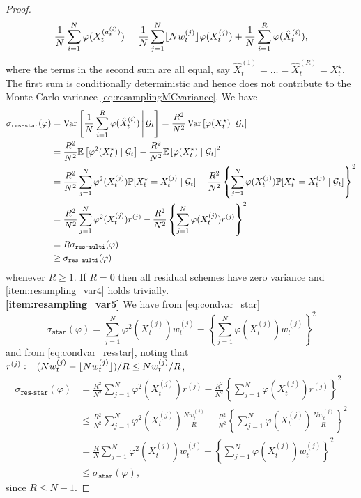 \begin{proof}
\begin{equation*}
\frac{1}{N} \sum_{i=1}^N \varphi( X_t^{(a_t^{(i)})} )
= \frac{1}{N} \sum_{j=1}^N \flnw[j] \varphi (X_t^{(j)})
        + \frac{1}{N} \sum_{i=1}^R \varphi (\hat{X}_t^{(i)}) ,
\end{equation*}
where the terms in the second sum are all equal, say $\hat{X}_t^{(1)} = \dots = \hat{X}_t^{(R)} = X_t^\star$.
The first sum is conditionally deterministic and hence does not contribute to the Monte Carlo variance \eqref{eq:resamplingMCvariance}.
We have
\begin{align}
\sigma_{\texttt{res-star}}(\varphi)
&= \V\left[ \frac{1}{N} \sum_{i=1}^R \varphi (\hat{X}_t^{(i)}) \midd \mathcal{G}_t \right] 
= \frac{R^2}{N^2} \V\left[ \varphi (X_t^\star) \midd \mathcal{G}_t \right] \notag\\
&= \frac{R^2}{N^2} \E\left[ \varphi^2( X_t^\star) \mid \mathcal{G}_t \right]
        - \frac{R^2}{N^2} \E\left[ \varphi( X_t^\star) \mid \mathcal{G}_t \right]^2 \notag\\
&= \frac{R^2}{N^2} \sum_{j=1}^N \varphi^2(X_t^{(j)}) 
        \Prob[ X_t^\star = X_t^{(j)} \mid \mathcal{G}_t ]
        - \frac{R^2}{N^2} \left\{ \sum_{j=1}^N \varphi(X_t^{(j)}) 
        \Prob[ X_t^\star = X_t^{(j)} \mid \mathcal{G}_t ] \right\}^2 \notag\\
&= \frac{R^2}{N^2} \sum_{j=1}^N \varphi^2(X_t^{(j)}) r^{(j)}
        - \frac{R^2}{N^2} \left\{ \sum_{j=1}^N \varphi(X_t^{(j)}) r^{(j)} \right\}^2 \label{eq:condvar_resstar}\\
&= R \sigma_{\texttt{res-multi}}(\varphi) \notag\\
&\geq \sigma_{\texttt{res-multi}}(\varphi) \notag
\end{align}
whenever $R\geq 1$. 
If $R=0$ then all residual schemes have zero variance and \ref{item:resampling_var4} holds trivially.\\
\textbf{\ref{item:resampling_var5}}
We have from \eqref{eq:condvar_star}
\begin{equation*}
\sigma_{\texttt{star}}(\varphi)
= \sum_{j=1}^N \varphi^2(X_t^{(j)}) w_t^{(j)}
        - \left\{ \sum_{j=1}^N \varphi(X_t^{(j)}) w_t^{(j)} \right\}^2
\end{equation*}
and from \eqref{eq:condvar_resstar}, noting that $r^{(j)} := (Nw_t^{(j)} - \flnw[j])/R \leq Nw_t^{(j)}/R$,
\begin{align*}
\sigma_{\texttt{res-star}}(\varphi)
&= \frac{R^2}{N^2} \sum_{j=1}^N \varphi^2(X_t^{(j)}) r^{(j)}
        - \frac{R^2}{N^2} \left\{ \sum_{j=1}^N \varphi(X_t^{(j)}) r^{(j)} \right\}^2 \\
&\leq \frac{R^2}{N^2} \sum_{j=1}^N \varphi^2(X_t^{(j)}) \frac{ N w_t^{(j)} }{R}
        - \frac{R^2}{N^2} \left\{ \sum_{j=1}^N \varphi(X_t^{(j)}) \frac{ N w_t^{(j)} }{R} \right\}^2 \\
&= \frac{R}{N} \sum_{j=1}^N \varphi^2(X_t^{(j)}) w_t^{(j)}
        - \left\{ \sum_{j=1}^N \varphi(X_t^{(j)}) w_t^{(j)} \right\}^2 \\
&\leq \sigma_{\texttt{star}}(\varphi) ,
\end{align*}
since $R\leq N-1$.
\end{proof}


